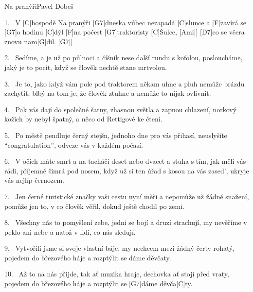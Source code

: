 \begin{song}{Na pranýři}{Pavel Dobeš}

\begin{xverse}{1.~}
V [C]hospodě Na pranýři [G7]dneska vůbec nezapadá [C]slunce
a [F]zavírá se [G7]o hodinu [C]dýl
[F]na počest [G7]traktoristy [C]{Šul}ce, [Ami|]{}
[D7]co se včera znovu naro[G]dil. [G7|]{}
\end{xverse}

\begin{xverse}{2.~}
Sedíme, a je už po půlnoci
a číšník nese další rundu s kofolou,
posloucháme, jaký je to pocit,
když se člověk nechtě stane mrtvolou.
\end{xverse}

\begin{xverse}{3.~}
Je to, jako když vám pole pod traktorem někam uhne
a pluh nemůže brázdu zachytit,
blbý na tom je, že člověk ztuhne
a nemůže to nijak ovlivnit.
\end{xverse}

\begin{xverse}{4.~}
Pak vás dají do společné šatny,
zhasnou světla a zapnou chlazení,
norkový kožich by nebyl špatný,
a něco od Rettigové ke čtení.
\end{xverse}

\begin{xverse}{5.~}
Po městě pendluje černý stejšn,
jednoho dne pro vás přihasí,
neuslyšíte ``congratulation'',
odveze vás v každém počasí.
\end{xverse}

\begin{xverse}{6.~}
V očích máte smrt a na tacháči deset nebo dvacet
a stuha s tím, jak měli vás rádi, příjemně šimrá pod nosem,
když už si ten úřad s kosou na vás zased',
ukryje vás nejlíp černozem.
\end{xverse}

\begin{xverse}{7.~}
Jen černé turistické značky vaši cestu nyní měří
a nepomůže už žádné snažení,
pomůže jen to, v co člověk věřil,
dokud ještě chodil po zemi.
\end{xverse}

\begin{xverse}{8.~}
Všechny nás to pomyšlení zebe,
jedni se bojí a druzí strachují,
my nevěříme v peklo ani nebe
a natož v lidi, co nás sledují.
\end{xverse}

\begin{xverse}{9.~}
Vytvořili jsme si svoje vlastní báje,
my nechcem mezi žádný čerty rohatý,
pojedem do březového háje
a rozptýlit se dáme děvčaty.
\end{xverse}

\begin{xverse}{10.~}
Až to na nás přijde, tak ať muzika hraje,
dechovka ať stojí před vraty,
pojedem do březového háje
a rozptýlit se [G7]dáme děvča[C]ty.
\end{xverse}

\end{song}



